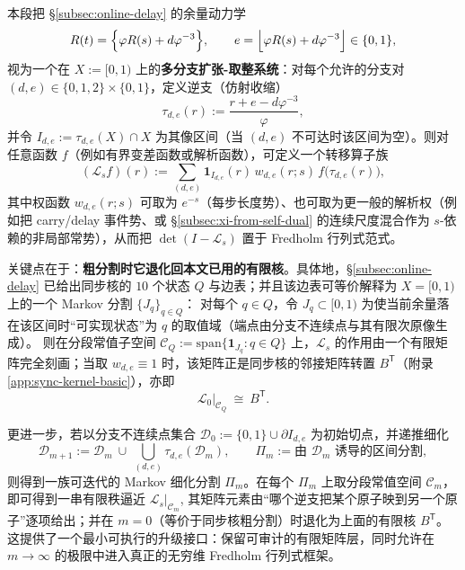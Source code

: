 \begin{remark}\label{rem:remainder-map-transfer-operator-refinement}
本段把 \S\ref{subsec:online-delay} 的余量动力学
\[
R(t)=\Bigl\{\varphi R(s)+d\varphi^{-3}\Bigr\},\qquad
e=\Bigl\lfloor \varphi R(s)+d\varphi^{-3}\Bigr\rfloor\in\{0,1\},
\]
视为一个在 \(X:=[0,1)\) 上的\textbf{多分支扩张-取整系统}：对每个允许的分支对 \((d,e)\in\{0,1,2\}\times\{0,1\}\)，定义逆支（仿射收缩）
\[
\tau_{d,e}(r):=\frac{r+e-d\varphi^{-3}}{\varphi},
\]
并令 \(I_{d,e}:=\tau_{d,e}(X)\cap X\) 为其像区间（当 \((d,e)\) 不可达时该区间为空）。则对任意函数 \(f\)（例如有界变差函数或解析函数），可定义一个转移算子族
\[
(\mathcal{L}_s f)(r)
:=\sum_{(d,e)}\mathbf{1}_{I_{d,e}}(r)\,w_{d,e}(r;s)\,f\!\bigl(\tau_{d,e}(r)\bigr),
\]
其中权函数 \(w_{d,e}(r;s)\) 可取为 \(e^{-s}\)（每步长度势）、也可取为更一般的解析权（例如把 carry/delay 事件势、或 \S\ref{subsec:xi-from-self-dual} 的连续尺度混合作为 \(s\)-依赖的非局部常势），从而把 \(\det(I-\mathcal{L}_s)\) 置于 Fredholm 行列式范式。
\par
关键点在于：\textbf{粗分割时它退化回本文已用的有限核}。具体地，\S\ref{subsec:online-delay} 已给出同步核的 $10$ 个状态 \(Q\) 与边表；并且该边表可等价解释为 \(X=[0,1)\) 上的一个 Markov 分割 \(\{J_q\}_{q\in Q}\)：
对每个 \(q\in Q\)，令 \(J_q\subset[0,1)\) 为使当前余量落在该区间时“可实现状态”为 \(q\) 的取值域（端点由分支不连续点与其有限次原像生成）。
则在分段常值子空间
\(
\mathcal{C}_Q:=\mathrm{span}\{\mathbf{1}_{J_q}:q\in Q\}
\)
上，\(\mathcal{L}_s\) 的作用由一个有限矩阵完全刻画；当取 \(w_{d,e}\equiv 1\) 时，该矩阵正是同步核的邻接矩阵转置 \(B^{\mathsf T}\)（附录 \ref{app:sync-kernel-basic}），亦即
\[
\mathcal{L}_0|_{\mathcal{C}_Q}\ \cong\ B^{\mathsf T}.
\]
\par
更进一步，若以分支不连续点集合 \(\mathcal{D}_0:=\{0,1\}\cup\partial I_{d,e}\) 为初始切点，并递推细化
\[
\mathcal{D}_{m+1}:=\mathcal{D}_m\ \cup\ \bigcup_{(d,e)}\tau_{d,e}(\mathcal{D}_m),
\qquad
\Pi_m:=\text{由 }\mathcal{D}_m\text{ 诱导的区间分割},
\]
则得到一族可迭代的 Markov 细化分割 \(\Pi_m\)。在每个 \(\Pi_m\) 上取分段常值空间 \(\mathcal{C}_m\)，即可得到一串有限秩逼近
\(
\mathcal{L}_s|_{\mathcal{C}_m}
\),
其矩阵元素由“哪个逆支把某个原子映到另一个原子”逐项给出；并在 \(m=0\)（等价于同步核粗分割）时退化为上面的有限核 \(B^{\mathsf T}\)。
这提供了一个最小可执行的升级接口：保留可审计的有限矩阵层，同时允许在 \(m\to\infty\) 的极限中进入真正的无穷维 Fredholm 行列式框架。
\end{remark}

